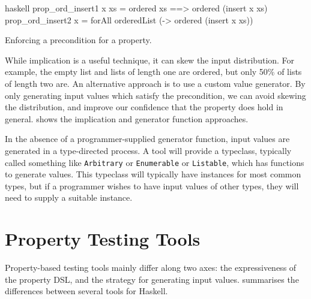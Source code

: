\begin{listing}
\centering
\begin{cminted}{haskell}
prop_ord_insert1 x xs = ordered xs ==> ordered (insert x xs)
prop_ord_insert2 x    = forAll orderedList (\xs -> ordered (insert x xs))
\end{cminted}
\caption{Enforcing a precondition for a property.}\label{lst:prop_ord_insert}
\end{listing}

While implication is a useful technique, it can skew the input
distribution.  For example, the empty list and lists of length one are
ordered, but only 50\% of lists of length two are.  An alternative
approach is to use a custom value generator.  By only generating input
values which satisfy the precondition, we can avoid skewing the
distribution, and improve our confidence that the property does hold
in general.   shows the implication and
generator function approaches.

In the absence of a programmer-supplied generator function, input
values are generated in a type-directed process.  A tool will provide
a typeclass, typically called something like \verb|Arbitrary| or
\verb|Enumerable| or \verb|Listable|, which has functions to generate
values.  This typeclass will typically have instances for most common
types, but if a programmer wishes to have input values of other types,
they will need to supply a suitable instance.

\section{Property Testing Tools}
\label{sec:property_testing-tools}

Property-based testing tools mainly differ along two axes: the
expressiveness of the property DSL, and the strategy for generating
input values.   summarises the differences between
several tools for Haskell.

\begingroup
\newcommand{\YY}{\CIRCLE}
\newcommand{\NN}{\Circle}
\newcommand{\YN}{\LEFTcircle}
\newcommand{\QQ}{\NN$^p$}

